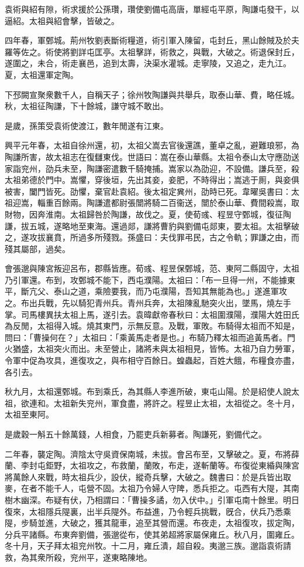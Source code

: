 \begin{pinyinscope}
袁術與紹有隙，術求援於公孫瓚，瓚使劉備屯高唐，單經屯平原，陶謙屯發干，以逼紹。太祖與紹會擊，皆破之。

四年春，軍鄄城。荊州牧劉表斷術糧道，術引軍入陳留，屯封丘，黑山餘賊及於夫羅等佐之。術使將劉詳屯匡亭。太祖擊詳，術救之，與戰，大破之。術退保封丘，遂圍之，未合，術走襄邑，追到太壽，決渠水灌城。走寧陵，又追之，走九江。夏，太祖還軍定陶。

下邳闕宣聚衆數千人，自稱天子；徐州牧陶謙與共舉兵，取泰山華、費，略任城。秋，太祖征陶謙，下十餘城，謙守城不敢出。

是歲，孫策受袁術使渡江，數年閒遂有江東。

興平元年春，太祖自徐州還，初，太祖父嵩去官後還譙，董卓之亂，避難琅邪，為陶謙所害，故太祖志在復讎東伐。世語曰：嵩在泰山華縣。太祖令泰山太守應劭送家詣兖州，劭兵未至，陶謙密遣數千騎掩捕。嵩家以為劭迎，不設備。謙兵至，殺太祖弟德於門中。嵩懼，穿後垣，先出其妾，妾肥，不時得出；嵩逃于厠，與妾俱被害，闔門皆死。劭懼，棄官赴袁紹。後太祖定兾州，劭時已死。韋曜吳書曰：太祖迎嵩，輜重百餘兩。陶謙遣都尉張闓將騎二百衞送，闓於泰山華、費間殺嵩，取財物，因奔淮南。太祖歸咎於陶謙，故伐之。夏，使荀彧、程昱守鄄城，復征陶謙，拔五城，遂略地至東海。還過郯，謙將曹豹與劉備屯郯東，要太祖。太祖擊破之，遂攻拔襄賁，所過多所殘戮。孫盛曰：夫伐罪弔民，古之令軌；罪謙之由，而殘其屬部，過矣。

會張邈與陳宮叛迎呂布，郡縣皆應。荀彧、程昱保鄄城，范、東阿二縣固守，太祖乃引軍還。布到，攻鄄城不能下，西屯濮陽。太祖曰：「布一旦得一州，不能據東平，斷亢父、泰山之道，乘險要我，而乃屯濮陽，吾知其無能為也。」遂進軍攻之。布出兵戰，先以騎犯青州兵。青州兵奔，太祖陳亂馳突火出，墜馬，燒左手掌。司馬樓異扶太祖上馬，遂引去。袁暐獻帝春秋曰：太祖圍濮陽，濮陽大姓田氏為反閒，太祖得入城。燒其東門，示無反意。及戰，軍敗。布騎得太祖而不知是，問曰：「曹操何在？」太祖曰：「乘黃馬走者是也。」布騎乃釋太祖而追黃馬者。門火猶盛，太祖突火而出。未至營止，諸將未與太祖相見，皆怖。太祖乃自力勞軍，令軍中促為攻具，進復攻之，與布相守百餘日。蝗蟲起，百姓大餓，布糧食亦盡，各引去。

秋九月，太祖還鄄城。布到乘氏，為其縣人李進所破，東屯山陽。於是紹使人說太祖，欲連和。太祖新失兖州，軍食盡，將許之。程昱止太祖，太祖從之。冬十月，太祖至東阿。

是歲穀一斛五十餘萬錢，人相食，乃罷吏兵新募者。陶謙死，劉備代之。

二年春，襲定陶。濟陰太守吳資保南城，未拔。會呂布至，又擊破之。夏，布將薛蘭、李封屯鉅野，太祖攻之，布救蘭，蘭敗，布走，遂斬蘭等。布復從東緍與陳宮將萬餘人來戰，時太祖兵少，設伏，縱奇兵擊，大破之。魏書曰：於是兵皆出取麥，在者不能千人，屯營不固。太祖乃令婦人守陴，悉兵拒之。屯西有大隄，其南樹木幽深。布疑有伏，乃相謂曰：「曹操多譎，勿入伏中。」引軍屯南十餘里。明日復來，太祖隱兵隄裏，出半兵隄外。布益進，乃令輕兵挑戰，旣合，伏兵乃悉乘隄，步騎並進，大破之，獲其龍車，追至其營而還。布夜走，太祖復攻，拔定陶，分兵平諸縣。布東奔劉備，張邈從布，使其弟超將家屬保雍丘。秋八月，圍雍丘。冬十月，天子拜太祖兖州牧。十二月，雍丘潰，超自殺。夷邈三族。邈詣袁術請救，為其衆所殺，兖州平，遂東略陳地。


\end{pinyinscope}
